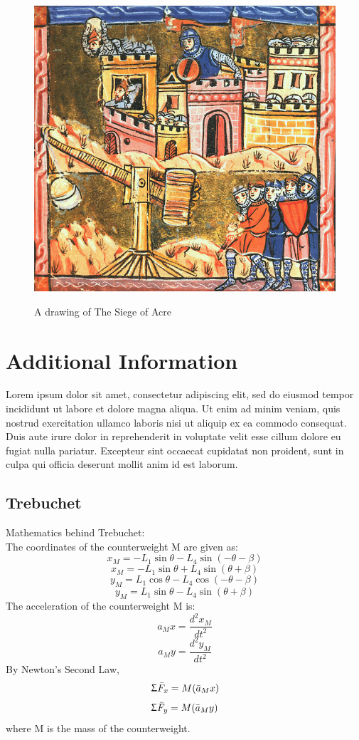 \documentclass[11pt]{book}
\begin{document}
\newpage
\begin{figure}
\begin{center}
\caption{A drawing of The Siege of Acre}
\centering
\label{fig:pictureofacre}
\includegraphics[scale=1.5]{three}
\end{center}
\end{figure}
\newpage
\chapter{Additional Information}
Lorem ipsum dolor sit amet, consectetur adipiscing elit, sed do eiusmod tempor incididunt ut labore et dolore magna aliqua. Ut enim ad minim veniam, quis nostrud exercitation ullamco laboris nisi ut aliquip ex ea commodo consequat. Duis aute irure dolor in reprehenderit in voluptate velit esse cillum dolore eu fugiat nulla pariatur. Excepteur sint occaecat cupidatat non proident, sunt in culpa qui officia deserunt mollit anim id est laborum. \cite{article1}
\newpage
\section{Trebuchet}
Mathematics behind Trebuchet:\\
The coordinates of the counterweight M are given as:
$$x_M = -L_1 \sin \theta - L_4 \sin (- \theta - \beta) $$ 
$$x_M = -L_1 \sin \theta + L_4 \sin (\theta + \beta) $$
$$y_M = L_1 \cos \theta - L_4 \cos (- \theta - \beta) $$
$$y_M = L_1 \sin \theta - L_4 \sin ( \theta + \beta) $$
The acceleration of the counterweight M is: 	
$$ a_Mx = \frac{d^2x_M}{dt^2} $$
$$ a_My = \frac{d^2y_M}{dt^2} $$
By Newton's Second Law,
$$ \Upsigma\bar{F}_x = M(\bar{a}_Mx) $$
$$ \Upsigma\bar{F}_y = M(\bar{a}_My) $$
where M is the mass of the counterweight. \\
\end{document}
